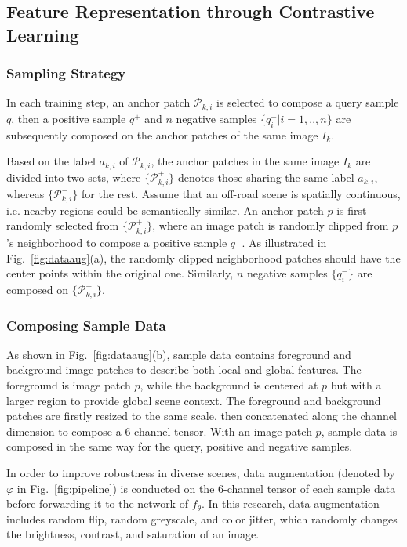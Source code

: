 \documentclass[letterpaper, 10 pt, conference]{ieeeconf}  %
\begin{document}
	\subsection{Feature Representation through Contrastive Learning}
	
	\subsubsection {Sampling Strategy}
	
	In each training step, an anchor patch $\mathcal{P}_{k,i}$ is selected to compose a query sample $q$, then a positive sample $q^+$ and $n$ negative samples $\{q^-_i|i=1,..,n\}$ are subsequently composed on the anchor patches of the same image $I_k$.
	
	Based on the label $a_{k,i}$ of $\mathcal{P}_{k,i}$, the anchor patches in the same image $I_k$ are divided into two sets, where $\{\mathcal{P}_{k,i}^+\}$ denotes those sharing the same label $a_{k,i}$, whereas $\{\mathcal{P}_{k,i}^-\}$ for the rest.
	Assume that an off-road scene is spatially continuous, i.e. nearby regions could be semantically similar. An anchor patch $p$ is first randomly selected from $\{\mathcal{P}_{k,i}^+\}$, where an image patch is randomly clipped from $p$'s neighborhood to compose a positive sample $q^+$. As illustrated in Fig.~\ref{fig:dataaug}(a), the randomly clipped neighborhood patches should have the center points within the original one. Similarly, $n$ negative samples $\{q^-_i\}$ are composed on $\{\mathcal{P}_{k,i}^-\}$.
	
	\subsubsection{Composing Sample Data}
	
	As shown in Fig.~\ref{fig:dataaug}(b), sample data contains foreground and background image patches to describe both local and global features. The foreground is image patch $p$, while the background is centered at $p$ but with a larger region to provide global scene context. The foreground and background patches are firstly resized to the same scale, then concatenated along the channel dimension to compose a 6-channel tensor.
	With an image patch $p$, sample data is composed in the same way for the query, positive and negative samples.
	
	In order to improve robustness in diverse scenes, data augmentation (denoted by $\varphi$ in Fig.~\ref{fig:pipeline}) is conducted on the 6-channel tensor of each sample data before forwarding it to the network of $f_{\theta}$. In this research, data augmentation includes random flip, random greyscale, and color jitter, which randomly changes the brightness, contrast, and saturation of an image.
	
\end{document}
